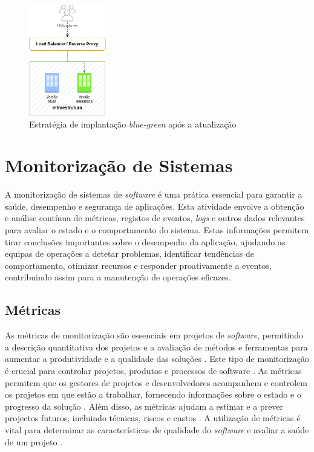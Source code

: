 \begin{figure}[H]
    \centering
    \includegraphics[width=0.3\textwidth]{media/content/estado-arte/blue-green-after.png}
    \caption{Estratégia de implantação \textit{blue-green} após a atualização}
    \label{fig:blue-green-after}
\end{figure}

\section{Monitorização de Sistemas}

A monitorização de sistemas de \textit{software} é uma prática essencial para garantir a saúde, 
desempenho e segurança de aplicações. Esta atividade envolve a obtenção e análise contínua de métricas, 
registos de eventos, \textit{logs} e outros dados relevantes para avaliar o estado e o comportamento 
do sistema. Estas informações permitem tirar conclusões importantes sobre o desempenho da aplicação, 
ajudando as equipas de operações a detetar problemas, identificar tendências de comportamento, 
otimizar recursos e responder proativamente a eventos, contribuindo assim para a manutenção de 
operações eficazes.

\subsection{Métricas}

As métricas de monitorização são essenciais em projetos de \textit{software}, permitindo a descrição 
quantitativa dos projetos e a avaliação de métodos e ferramentas para aumentar a produtividade e a 
qualidade das soluções \cite{metrics2003}. Este tipo de monitorização é crucial para controlar 
projetos, produtos e processos de software \cite{metrics2019}. As métricas permitem que os 
gestores de projetos e desenvolvedores acompanhem e controlem os projetos em que estão a trabalhar,
fornecendo informações sobre o estado e o progresso da solução \cite{metrics2016}. Além disso, as 
métricas ajudam a estimar e a prever projectos futuros, incluindo técnicas, riscos e custos 
\cite{metrics2016b}. A utilização de métricas é vital para determinar as características de 
qualidade do \textit{software} e avaliar a saúde de um projeto \cite{metrics2015}.


